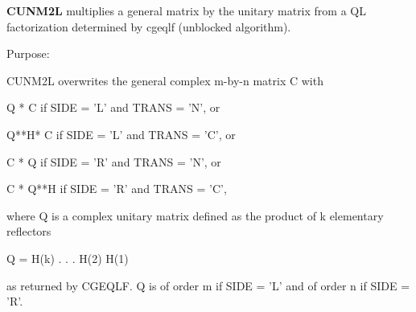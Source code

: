 {\bfseries C\+U\+N\+M2\+L} multiplies a general matrix by the unitary matrix from a Q\+L factorization determined by cgeqlf (unblocked algorithm). 

 \begin{DoxyParagraph}{Purpose\+: }
\begin{DoxyVerb} CUNM2L overwrites the general complex m-by-n matrix C with

       Q * C  if SIDE = 'L' and TRANS = 'N', or

       Q**H* C  if SIDE = 'L' and TRANS = 'C', or

       C * Q  if SIDE = 'R' and TRANS = 'N', or

       C * Q**H if SIDE = 'R' and TRANS = 'C',

 where Q is a complex unitary matrix defined as the product of k
 elementary reflectors

       Q = H(k) . . . H(2) H(1)

 as returned by CGEQLF. Q is of order m if SIDE = 'L' and of order n
 if SIDE = 'R'.\end{DoxyVerb}
 
\end{DoxyParagraph}

